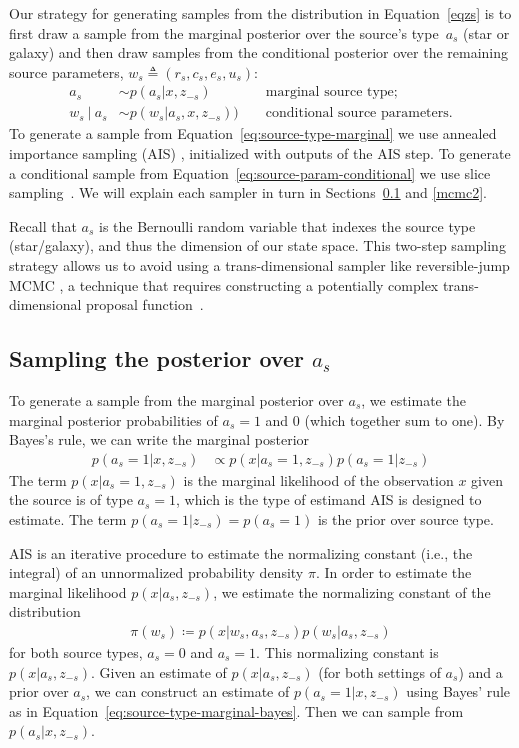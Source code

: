 Our strategy for generating samples from the distribution in Equation~\ref{eqzs} is to first draw a sample from the marginal posterior over the source's type~$a_s$ (star or galaxy) and then draw samples from the conditional posterior over the remaining source parameters, $w_s \triangleq (r_s, c_s, e_s, u_s)$:
\begin{align}
    a_s &\sim p(a_s | x, z_{-s}) && \text{ marginal source type; } \label{eq:source-type-marginal} \\
    w_s ~\vert~ a_s &\sim  p(w_s | a_s, x, z_{-s})) && \text{ conditional source parameters.} \label{eq:source-param-conditional}
\end{align}
To generate a sample from Equation~\ref{eq:source-type-marginal} we use annealed importance sampling (AIS) \citep{neal2001annealed}, initialized with outputs of the AIS step.
To generate a conditional sample from Equation~\ref{eq:source-param-conditional} we use slice sampling~\citep{neal2003slice}. 
We will explain each sampler in turn in Sections~\ref{mcmc1} and \ref{mcmc2}.

Recall that $a_s$ is the Bernoulli random variable that indexes the source type (star/galaxy), and thus the dimension of our state space.
This two-step sampling strategy allows us to avoid using a trans-dimensional sampler like reversible-jump MCMC \citep{green1995reversible}, a technique that requires constructing a potentially complex trans-dimensional proposal function~\citep{fan2011reversible}.

\subsection{Sampling the posterior over $a_s$}
\label{mcmc1}
To generate a sample from the marginal posterior over $a_s$, we estimate the marginal posterior probabilities of $a_s=1$ and $0$ (which together sum to one).
By Bayes's rule, we can write the marginal posterior
\begin{align}
p(a_s = 1 | x, z_{-s}) &\propto p(x | a_s = 1, z_{-s}) p(a_s=1 | z_{-s}) \label{eq:source-type-marginal-bayes}
\end{align}
The term $p(x | a_s=1, z_{-s})$ is the marginal likelihood of the observation $x$ given the source is of type $a_s=1$, which is the type of estimand AIS is designed to estimate.  The term $p(a_s=1 | z_{-s}) = p(a_s=1)$ is the prior over source type.

AIS is an iterative procedure to estimate the normalizing constant (i.e., the integral) of an unnormalized probability density $\pi$.  In order to estimate the marginal likelihood $p(x | a_s, z_{-s})$, we estimate the normalizing constant of the distribution 
\begin{align}
\pi(w_s) \coloneqq p(x | w_s, a_s, z_{-s}) p(w_s | a_s, z_{-s})
\end{align}
for both source types, $a_s = 0$ and $a_s=1$.  
This normalizing constant is $p(x | a_s, z_{-s})$.
Given an estimate of $p(x | a_s, z_{-s})$ (for both settings of $a_s$) and a prior over $a_s$, we can construct an estimate of $p(a_s = 1 | x, z_{-s})$ using Bayes' rule as in Equation~\ref{eq:source-type-marginal-bayes}.
Then we can sample from $p(a_s | x, z_{-s})$.

